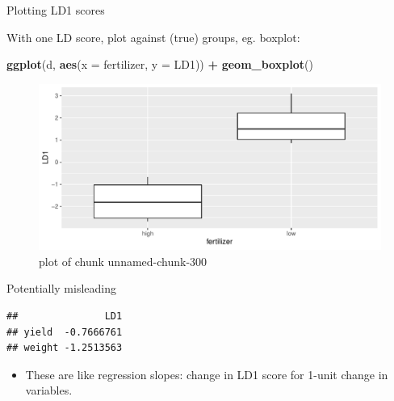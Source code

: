 \documentclass[ignorenonframetext,]{beamer}
\newenvironment{Shaded}{\begin{snugshade}}{\end{snugshade}}
\newcommand{\DataTypeTok}[1]{\textcolor[rgb]{0.13,0.29,0.53}{#1}}
\newcommand{\FloatTok}[1]{\textcolor[rgb]{0.00,0.00,0.81}{#1}}
\newcommand{\KeywordTok}[1]{\textcolor[rgb]{0.13,0.29,0.53}{\textbf{#1}}}
\newcommand{\NormalTok}[1]{#1}
\newcommand{\OperatorTok}[1]{\textcolor[rgb]{0.81,0.36,0.00}{\textbf{#1}}}
\newcommand{\StringTok}[1]{\textcolor[rgb]{0.31,0.60,0.02}{#1}}
\providecommand{\tightlist}{%
  \setlength{\itemsep}{0pt}\setlength{\parskip}{0pt}}
\begin{document}
\begin{frame}[fragile]{Plotting LD1 scores}
\protect\hypertarget{plotting-ld1-scores}{}

With one LD score, plot against (true) groups, eg. boxplot:

\begin{Shaded}
\begin{Highlighting}[]
\KeywordTok{ggplot}\NormalTok{(d, }\KeywordTok{aes}\NormalTok{(}\DataTypeTok{x =}\NormalTok{ fertilizer, }\DataTypeTok{y =}\NormalTok{ LD1)) }\OperatorTok{+}\StringTok{ }\KeywordTok{geom_boxplot}\NormalTok{()}
\end{Highlighting}
\end{Shaded}

\begin{figure}
\centering
\includegraphics{figure/unnamed-chunk-300-1.pdf}
\caption{plot of chunk unnamed-chunk-300}
\end{figure}

\end{frame}

\begin{frame}[fragile]{Potentially misleading}
\protect\hypertarget{potentially-misleading}{}

\begin{Shaded}
\end{Shaded}

\begin{verbatim}
##               LD1
## yield  -0.7666761
## weight -1.2513563
\end{verbatim}

\begin{itemize}
\tightlist
\item
  These are like regression slopes: change in LD1 score for 1-unit
  change in variables.
\end{itemize}

\end{frame}
\end{document}
